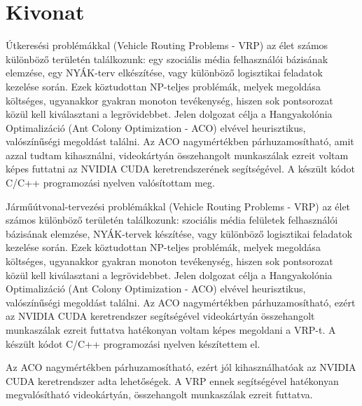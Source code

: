 \setcounter{page}{1}

\selecthungarian

\chapter*{Kivonat}

Útkeresési problémákkal (Vehicle Routing Problems - VRP) az élet számos különböző területén találkozunk: egy szociális média felhasználói bázisának elemzése, egy NYÁK-terv elkészítése, vagy különböző logisztikai feladatok kezelése során. Ezek köztudottan NP-teljes problémák, melyek megoldása költséges, ugyanakkor gyakran monoton tevékenység, hiszen sok pontsorozat közül kell kiválasztani a legrövidebbet. Jelen dolgozat célja a Hangyakolónia Optimalizáció (Ant Colony Optimization - ACO) elvével heurisztikus, valószínűségi megoldást találni. Az ACO nagymértékben párhuzamosítható, amit azzal tudtam kihasználni, videokártyán összehangolt munkaszálak ezreit voltam képes futtatni az NVIDIA CUDA keretrendszerének segítségével. A készült kódot C/C++ programozási nyelven valósítottam meg.


Járműútvonal-tervezési problémákkal (Vehicle Routing Problems - VRP) az élet számos különböző területén találkozunk: szociális média felületek felhasználói bázisának elemzése, NYÁK-tervek készítése, vagy különböző logisztikai feladatok kezelése során. Ezek köztudottan NP-teljes problémák, melyek megoldása költséges, ugyanakkor gyakran monoton tevékenység, hiszen sok pontsorozat közül kell kiválasztani a legrövidebbet. Jelen dolgozat célja a Hangyakolónia Optimalizáció (Ant Colony Optimization - ACO) elvével heurisztikus, valószínűségi megoldást találni. Az ACO nagymértékben párhuzamosítható, ezért az NVIDIA CUDA keretrendszer segítségével videokártyán összehangolt munkaszálak ezreit futtatva hatékonyan voltam képes megoldani a VRP-t. A készült kódot C/C++ programozási nyelven készítettem el.

Az ACO nagymértékben párhuzamosítható, ezért jól kihasználhatóak az NVIDIA CUDA keretrendszer adta lehetőségek. A VRP ennek segítségével hatékonyan megvalósítható videokártyán, összehangolt munkaszálak ezreit futtatva.

\vfill
\selectenglish



